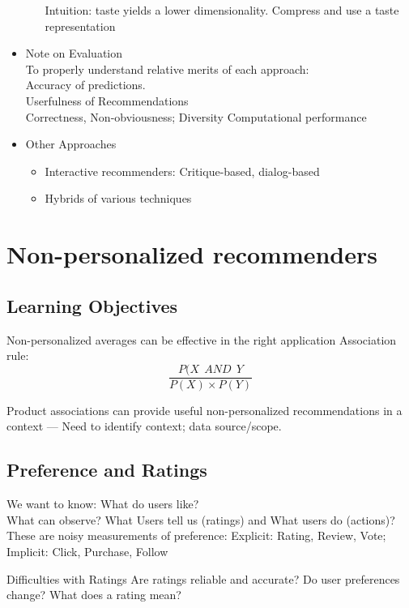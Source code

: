 \documentclass[fleqn,twoside]{article}
\begin{document}
\begin{itemize}
\begin{itemize}
		Intuition: taste yields a lower dimensionality.
		Compress and use a taste representation
	\end{itemize}
\item Note on Evaluation \\
	To properly understand relative merits of each approach:\\
		Accuracy of predictions.\\
		Userfulness of Recommendations \\
			Correctness, Non-obviousness; Diversity
		Computational performance
\item Other Approaches
	\begin{itemize}
	\item Interactive recommenders: Critique-based, dialog-based
	\item Hybrids of various techniques
	\end{itemize}
\end{itemize}


\section{Non-personalized recommenders}
\subsection{Learning Objectives}

Non-personalized averages can be effective in the right application
Association rule:
\begin{equation}
	\frac{P(X~~AND~~Y}{P(X)\times P(Y)}
\end{equation}

Product associations can provide useful non-personalized recommendations in a context --- Need to identify context; data source/scope.

\subsection{Preference and Ratings}

	We want to know: What do users like? \\
	What can observe? What Users tell us (ratings) and What users do (actions)?\\
	These are noisy measurements of preference:
		Explicit: Rating, Review, Vote; 
		Implicit:  Click, Purchase,  Follow
		
	Difficulties with Ratings
		Are ratings reliable and accurate?
		Do user preferences change?
		What does a rating mean?
		
\end{document}
